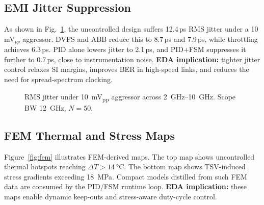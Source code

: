 \documentclass[conference]{IEEEtran}
\begin{document}
\subsection{EMI Jitter Suppression}
As shown in Fig.~\ref{fig:emi}, the uncontrolled design suffers 12.4\,ps RMS jitter under a 10\,mV$_{pp}$ aggressor. DVFS and ABB reduce this to 8.7\,ps and 7.9\,ps, while throttling achieves 6.3\,ps. PID alone lowers jitter to 2.1\,ps, and PID+FSM suppresses it further to 0.7\,ps, close to instrumentation noise.  
\textbf{EDA implication:} tighter jitter control relaxes SI margins, improves BER in high-speed links, and reduces the need for spread-spectrum clocking.

\begin{figure}[t]
\centering
{}
\caption{RMS jitter under \SI{10}{mV_{pp}} aggressor across \SIrange{2}{10}{GHz}. Scope BW \SI{12}{GHz}, $N=50$.}
\label{fig:emi}
\end{figure}

\subsection{FEM Thermal and Stress Maps}
Figure~\ref{fig:fem} illustrates FEM-derived maps. The top map shows uncontrolled thermal hotspots reaching $\Delta T>\SI{14}{\celsius}$. The bottom map shows TSV-induced stress gradients exceeding \SI{18}{MPa}. Compact models distilled from such FEM data are consumed by the PID/FSM runtime loop.%
\noindent\textbf{EDA implication:} these maps enable dynamic keep-outs and stress-aware duty-cycle control.
\end{document}
